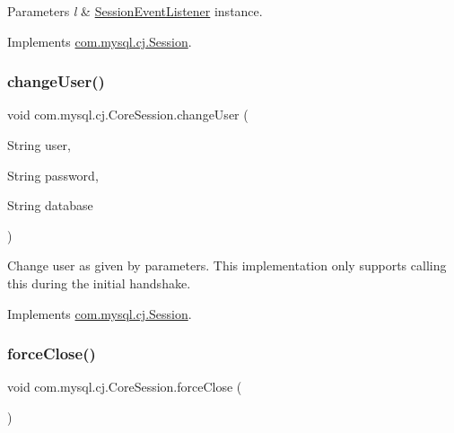 \begin{DoxyParams}{Parameters}
{\em l} & \mbox{\hyperlink{}{Session\+Event\+Listener}} instance. \\
\hline
\end{DoxyParams}


Implements \mbox{\hyperlink{interfacecom_1_1mysql_1_1cj_1_1_session_a10e70a1ef528b3a067cd682cc5eddfb9}{com.\+mysql.\+cj.\+Session}}.

\mbox{\label{classcom_1_1mysql_1_1cj_1_1_core_session_afd7da447c9a92c0a51ba81a6ac82e89f}} 
\subsubsection{\texorpdfstring{change\+User()}{changeUser()}}
{\footnotesize\ttfamily void com.\+mysql.\+cj.\+Core\+Session.\+change\+User (\begin{DoxyParamCaption}\item[{String}]{user,  }\item[{String}]{password,  }\item[{String}]{database }\end{DoxyParamCaption})}

Change user as given by parameters. This implementation only supports calling this during the initial handshake. 

Implements \mbox{\hyperlink{interfacecom_1_1mysql_1_1cj_1_1_session_ae89407fa6e67fd4537f06c85f0a2695b}{com.\+mysql.\+cj.\+Session}}.

\mbox{\label{classcom_1_1mysql_1_1cj_1_1_core_session_a9a0da3cad1f23cae2481b9e8788e4bff}} 
\subsubsection{\texorpdfstring{force\+Close()}{forceClose()}}
{\footnotesize\ttfamily void com.\+mysql.\+cj.\+Core\+Session.\+force\+Close (\begin{DoxyParamCaption}{ }\end{DoxyParamCaption})}

